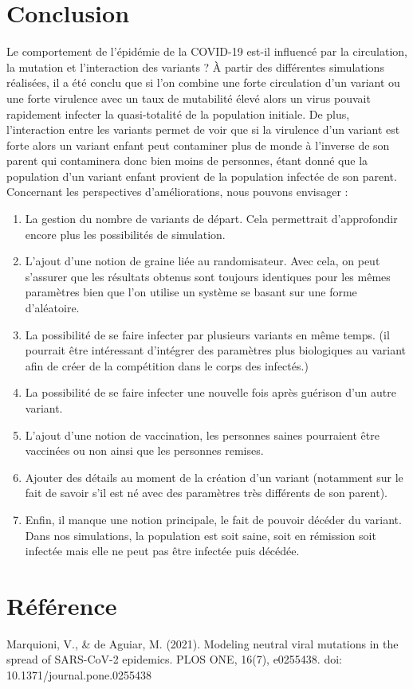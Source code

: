 \documentclass{article}
\begin{document}
\section{Conclusion}

Le comportement de l'épidémie de la COVID-19 est-il influencé par la circulation, la mutation et l'interaction des variants ?
À partir des différentes simulations réalisées, il a été conclu que si l'on combine une forte circulation d'un variant ou une forte virulence avec un taux de mutabilité élevé alors un virus pouvait rapidement infecter la quasi-totalité de la population initiale. De plus, l'interaction entre les variants permet de voir que si la virulence d'un variant est forte alors un variant enfant peut contaminer plus de monde à l'inverse de son parent qui contaminera donc bien moins de personnes, étant donné que la population d'un variant enfant provient de la population infectée de son parent. \\
\noindent
Concernant les perspectives d'améliorations, nous pouvons envisager :
\begin{enumerate}
    \item La gestion du nombre de variants de départ. Cela permettrait d'approfondir encore plus les possibilités de simulation.
    \item L'ajout d'une notion de graine liée au randomisateur. Avec cela, on peut s'assurer que les résultats obtenus sont toujours identiques pour les mêmes paramètres bien que l'on utilise un système se basant sur une forme d'aléatoire.
    \item La possibilité de se faire infecter par plusieurs variants en même temps. (il pourrait être intéressant d'intégrer des paramètres plus biologiques au variant afin de créer de la compétition dans le corps des infectés.)
    \item La possibilité de se faire infecter une nouvelle fois après guérison d'un autre variant.
    \item L'ajout d'une notion de vaccination, les personnes saines pourraient être vaccinées ou non ainsi que les personnes remises.
    \item Ajouter des détails au moment de la création d'un variant (notamment sur le fait de savoir s'il est né avec des paramètres très différents de son parent).
    \item Enfin, il manque une notion principale, le fait de pouvoir décéder du variant. Dans nos simulations, la population est soit saine, soit en rémission soit infectée mais elle ne peut pas être infectée puis décédée.
\end{enumerate}

\section{Référence}

Marquioni, V., & de Aguiar, M. (2021). Modeling neutral viral mutations in the spread of SARS-CoV-2 epidemics. PLOS ONE, 16(7), e0255438. doi: 10.1371/journal.pone.0255438
\end{document}
